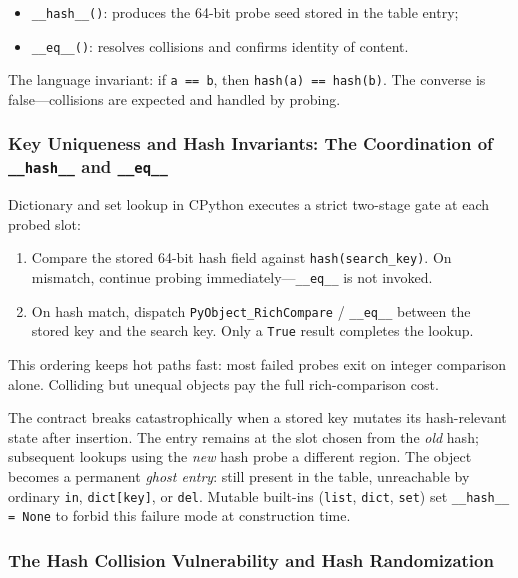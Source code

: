 \documentclass[a4paper,twoside]{report}
\begin{document}
\begin{itemize}
    \item \texttt{\_\_hash\_\_()}: produces the 64-bit probe seed stored in the table entry;
    \item \texttt{\_\_eq\_\_()}: resolves collisions and confirms identity of content.
\end{itemize}

The language invariant: if \texttt{a == b}, then \texttt{hash(a) == hash(b)}. The converse is false---collisions are expected and handled by probing.

\subsubsection{Key Uniqueness and Hash Invariants: The Coordination of \texttt{\_\_hash\_\_} and \texttt{\_\_eq\_\_}}

Dictionary and set lookup in CPython executes a strict two-stage gate at each probed slot:

\begin{enumerate}
    \item Compare the stored 64-bit hash field against \texttt{hash(search\_key)}. On mismatch, continue probing immediately---\texttt{\_\_eq\_\_} is not invoked.
    \item On hash match, dispatch \texttt{PyObject\_RichCompare} / \texttt{\_\_eq\_\_} between the stored key and the search key. Only a \texttt{True} result completes the lookup.
\end{enumerate}

This ordering keeps hot paths fast: most failed probes exit on integer comparison alone. Colliding but unequal objects pay the full rich-comparison cost.

The contract breaks catastrophically when a stored key mutates its hash-relevant state after insertion. The entry remains at the slot chosen from the \emph{old} hash; subsequent lookups using the \emph{new} hash probe a different region. The object becomes a permanent \emph{ghost entry}: still present in the table, unreachable by ordinary \texttt{in}, \texttt{dict[key]}, or \texttt{del}. Mutable built-ins (\texttt{list}, \texttt{dict}, \texttt{set}) set \texttt{\_\_hash\_\_ = None} to forbid this failure mode at construction time.

\subsubsection{The Hash Collision Vulnerability and Hash Randomization}
\end{document}
